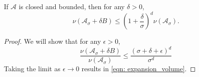 \documentclass[11pt,twoside]{article}
\newcommand{\1}{\mathbbm{1}}
\newcommand{\Aset}{\mathcal{A}}
\newcommand{\Asig}{\Aset_{\sigma}}
\begin{document}
\begin{lemma}
	\label{lem: expansion_volume}
	If $\Aset$ is closed and bounded, then for any $\delta > 0$,
	\begin{equation}
	\label{eqn: expansion_volume}
	\nu(\Asig + \delta B) \leq \left(1 + \frac{\delta}{\sigma}\right)^d \nu(\Asig).
	\end{equation}
\end{lemma}
\begin{proof}
	We will show that for any $\epsilon > 0$, 
	\begin{equation}
	\label{eqn: ratio_of_volume}
	\frac{\nu(\Asig + \delta B)}{\nu(\Asig)} \leq \frac{(\sigma + \delta + \epsilon)^d}{\sigma^d}
	\end{equation}
	Taking the limit as $\epsilon \to 0$ results in \eqref{eqn: expansion_volume}.
	

\end{proof}
\end{document}
